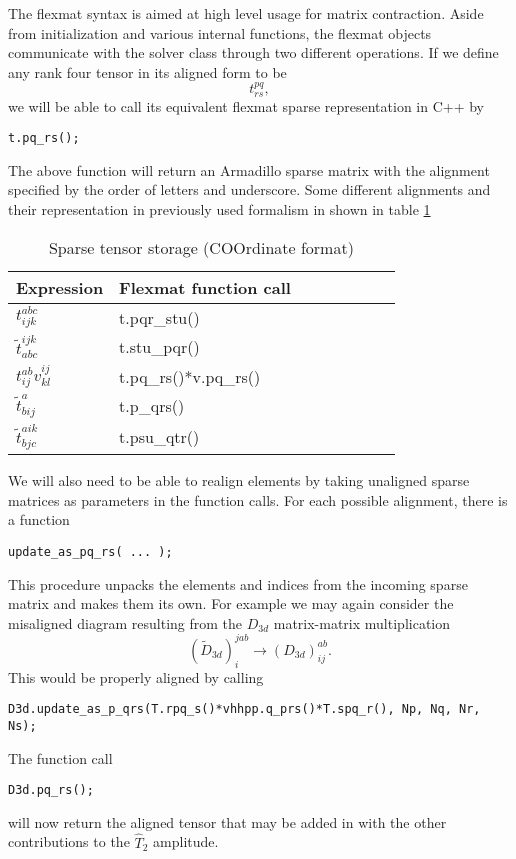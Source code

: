 The flexmat syntax is aimed at high level usage for matrix
contraction. Aside from initialization and various internal functions,
the flexmat objects communicate with the solver class through two
different operations. If we define any rank four tensor in its aligned
form to be
\begin{equation}
t^{pq}_{rs} ,
\end{equation}
we will be able to call its equivalent flexmat sparse representation in C++ by
\begin{verbatim}
t.pq_rs(); 
\end{verbatim}
The above function will return an Armadillo sparse matrix with the
alignment specified by the order of letters and underscore. Some
different alignments and their representation in previously used
formalism in shown in table \ref{tab:sparse_alignments}
\begin{table}[]
\centering
\caption{Sparse tensor storage (COOrdinate format)}
\label{tab:sparse_alignments}
\begin{tabular}{llllllll}
Expression & Flexmat function call \\ \hline
$t^{abc}_{ijk}$ & t.pqr\_stu() \\
$\tilde{t}^{ijk}_{abc}$ & t.stu\_pqr() \\
$t^{ab}_{ij} v^{ij}_{kl}$ & t.pq\_rs()*v.pq\_rs() \\
$\tilde{t}^a_{bij}$ & t.p\_qrs() \\
$\tilde{t}^{aik}_{bjc}$ & t.psu\_qtr() \\
\end{tabular}
\end{table}

We will also need to be able to realign elements by taking unaligned sparse matrices as parameters in the function calls. For each possible alignment, there is a function
\begin{verbatim}
update_as_pq_rs( ... );
\end{verbatim}
This procedure unpacks the elements and indices from the incoming
sparse matrix and makes them its own. For example we may again
consider the misaligned diagram resulting from the $D_{3d}$ matrix-matrix
multiplication
\begin{equation}
 (\tilde{D}_{3d})^{jab}_{i} \rightarrow (D_{3d})^{ab}_{ij}.
\end{equation}
This would be properly aligned by calling
\begin{verbatim}
D3d.update_as_p_qrs(T.rpq_s()*vhhpp.q_prs()*T.spq_r(), Np, Nq, Nr, Ns);
\end{verbatim}
The function call
\begin{verbatim}
D3d.pq_rs();
\end{verbatim}
will now return the aligned tensor that may be added in with the other contributions to the $\hat{T}_2$ amplitude.

